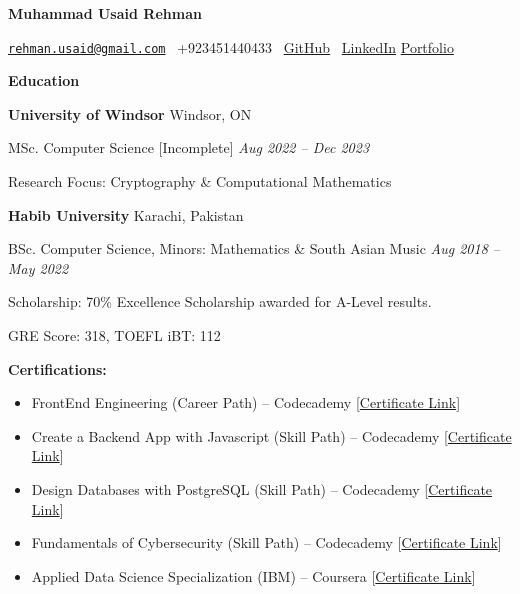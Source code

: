 \documentclass[12pt, a4paper]{article}
\begin{document}
{}\selectfont

\begin{center}
	\Large\textbf{Muhammad Usaid Rehman}\\
	\hrulefill
\end{center}

\begin{center}
	\href{mailto:rehman.usaid@gmail.com}{\texttt{rehman.usaid@gmail.com}} \textbullet \ +923451440433 \textbullet \ \href{https://github.com/m-usaid99}{GitHub} \textbullet \ \href{https://www.linkedin.com/in/muhammad-usaid-rehman-aa8b64202/}{LinkedIn} \textbullet \href{https://musaid-rehman.vercel.app}{Portfolio}
\end{center}

\begin{center}
	\large\textbf{Education}
\end{center}

\textbf{University of Windsor}  \hfill Windsor, ON

MSc. Computer Science [Incomplete]  \hfill \textit{Aug 2022 -- Dec 2023}

Research Focus: Cryptography \& Computational Mathematics



\vspace{12pt}
\textbf{Habib University} \hfill Karachi, Pakistan

BSc. Computer Science, Minors: Mathematics \& South Asian Music \hfill \textit{Aug 2018 -- May 2022}

Scholarship: 70\% Excellence Scholarship awarded for A-Level results.

GRE Score: 318, TOEFL iBT: 112

\vspace{12pt}
\textbf{Certifications:}
\begin{itemize}[noitemsep, topsep=0pt, partopsep=0pt, parsep=0pt]
	\item FrontEnd Engineering (Career Path) -- Codecademy \hfill [\href{https://www.codecademy.com/profiles/candyclaws99/certificates/2682884a0719474f96407efe432fdd87}{Certificate Link}]
	\item Create a Backend App with Javascript (Skill Path) -- Codecademy \hfill [\href{https://www.codecademy.com/profiles/candyclaws99/certificates/5cb678013709022f5b908913}{Certificate Link}]
	\item  Design Databases with PostgreSQL (Skill Path) -- Codecademy \hfill [{\href{https://www.codecademy.com/profiles/candyclaws99/certificates/5f64e3b492de0000131ecbe0}{Certificate Link}}]
	\item Fundamentals of Cybersecurity (Skill Path) -- Codecademy \hfill [\href{https://www.codecademy.com/profiles/candyclaws99/certificates/06984a073b064e61879cca3e82a9b3d2}{Certificate Link}]
	\item Applied Data Science Specialization (IBM) -- Coursera \hfill [\href{https://coursera.org/share/d030e4f8979b8718d0b067ae3f467d33}{Certificate Link}]
\end{itemize}
\end{document}
